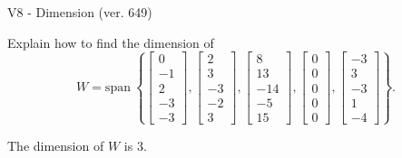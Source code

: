 \begin{exercise}
  \begin{exerciseTitle}V8 - Dimension (ver. 649)\end{exerciseTitle}
  \begin{exerciseStatement}
    Explain how to find the dimension of 
\[W=\mathrm{span}\ \left\{\left[\begin{array}{r}
0 \\
-1 \\
2 \\
-3 \\
-3
\end{array}\right] , \left[\begin{array}{r}
2 \\
3 \\
-3 \\
-2 \\
3
\end{array}\right] , \left[\begin{array}{r}
8 \\
13 \\
-14 \\
-5 \\
15
\end{array}\right] , \left[\begin{array}{r}
0 \\
0 \\
0 \\
0 \\
0
\end{array}\right] , \left[\begin{array}{r}
-3 \\
3 \\
-3 \\
1 \\
-4
\end{array}\right]\right\}.\]



  \end{exerciseStatement}
  \begin{exerciseAnswer}
   The dimension of \(W\) is  \(3\).
  


  \end{exerciseAnswer}
\end{exercise}